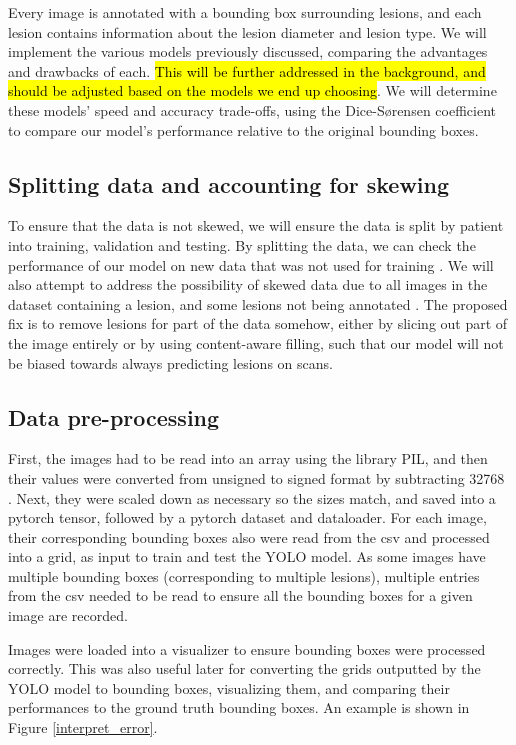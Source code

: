 Every image is annotated with a bounding box surrounding lesions, and each lesion contains information about the lesion diameter and lesion type.
We will implement the various models previously discussed, comparing the advantages and drawbacks of each. \hl{This will be further addressed in the background, and should be adjusted based on the models we end up choosing}. We will determine these models' speed and accuracy trade-offs, using the Dice-Sørensen coefficient to compare our model’s performance relative to the original bounding boxes.

\subsection{Splitting data and accounting for skewing}
To ensure that the data is not skewed, we will ensure the data is split by patient into training, validation and testing. By splitting the data, we can check the performance of our model on new data that was not used for training \cite{chollet_deep_learning}. We will also attempt to address the possibility of skewed data due to all images in the dataset containing a lesion, and some lesions not being annotated \cite{deeplesion}. The proposed fix is to remove lesions for part of the data somehow, either by slicing out part of the image entirely or by using content-aware filling, such that our model will not be biased towards always predicting lesions on scans.

\subsection{Data pre-processing}
First, the images had to be read into an array using the library PIL, and then their values were converted from unsigned to signed format by subtracting 32768 \cite{deeplesion}. Next, they were scaled down as necessary so the sizes match, and saved into a pytorch tensor, followed by a pytorch dataset and dataloader. For each image, their corresponding bounding boxes also were read from the csv and processed into a grid, as input to train and test the YOLO model. As some images have multiple bounding boxes (corresponding to multiple lesions), multiple entries from the csv needed to be read to ensure all the bounding boxes for a given image are recorded.

Images were loaded into a visualizer to ensure bounding boxes were processed correctly. This was also useful later for converting the grids outputted by the YOLO model to bounding boxes, visualizing them, and comparing their performances to the ground truth bounding boxes. An example is shown in Figure \ref{interpret_error}.

